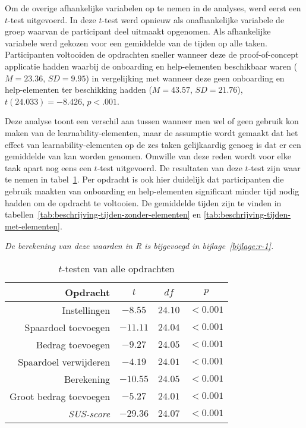 Om de overige afhankelijke variabelen op te nemen in de analyses, werd eerst een $t$-test uitgevoerd. In deze $t$-test werd opnieuw als onafhankelijke variabele de groep waarvan de participant deel uitmaakt opgenomen. Als afhankelijke variabele werd gekozen voor een gemiddelde van de tijden op alle taken. Participanten voltooiden de opdrachten sneller wanneer deze de proof-of-concept applicatie hadden waarbij de onboarding en help-elementen beschikbaar waren ($M = 23.36$, $SD = 9.95$) in vergelijking met wanneer deze geen onboarding en help-elementen ter beschikking hadden ($M = 43.57$, $SD = 21.76$), $t(24.033) = -8.426$, $p < .001$.

Deze analyse toont een verschil aan tussen wanneer men wel of geen gebruik kon maken van de learnability-elementen, maar de assumptie wordt gemaakt dat het effect van learnability-elementen op de zes taken gelijkaardig genoeg is dat er een gemiddelde van kan worden genomen. Omwille van deze reden wordt voor elke taak apart nog eens een $t$-test uitgevoerd. De resultaten van deze $t$-test zijn waar te nemen in tabel~\ref{tab:ttest-opdrachten}. Per opdracht is ook hier duidelijk dat participanten die gebruik maakten van onboarding en help-elementen significant minder tijd nodig hadden om de opdracht te voltooien. De gemiddelde tijden zijn te vinden in tabellen~\ref{tab:beschrijving-tijden-zonder-elementen} en \ref{tab:beschrijving-tijden-met-elementen}.

\textit{De berekening van deze waarden in R is bijgevoegd in bijlage~\ref{bijlage:r-1}.}

\begin{table}[]
	\centering
	\begin{tabular}{r|ccc}
		\textbf{Opdracht} & \textbf{$t$} & \textbf{$df$} & \textbf{$p$} \\ \hline
		Instellingen & $-8.55$ & $24.10$ & $< 0.001$ \\
		Spaardoel toevoegen & $-11.11$ & $24.04$ & $< 0.001$ \\
		Bedrag toevoegen & $-9.27$ & $24.05$ & $< 0.001$ \\
		Spaardoel verwijderen & $-4.19$ & $24.01$ & $< 0.001$ \\
		Berekening & $-10.55$ & $24.05$ & $< 0.001$ \\
		Groot bedrag toevoegen & $-5.27$ & $24.01$ & $< 0.001$ \\
		\textit{SUS-score} & $-29.36$ & $24.07$ & $< 0.001$
	\end{tabular}
	\caption{$t$-testen van alle opdrachten}
	\label{tab:ttest-opdrachten}
\end{table}

